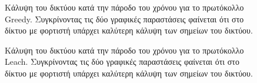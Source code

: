 \begin{figure}[H]
  \centering
  \caption{Κάλυψη του δικτύου κατά την πάροδο του χρόνου για το πρωτόκολλο Greedy. Συγκρίνοντας τις δύο γραφικές παραστάσεις φαίνεται ότι στο δίκτυο με φορτιστή
υπάρχει καλύτερη κάλυψη των σημείων του δικτύου.}
  \label{fig:1exp_3_1}
\end{figure}

\begin{figure}[H]
  \centering
  \caption{Κάλυψη του δικτύου κατά την πάροδο του χρόνου για το πρωτόκολλο Leach. Συγκρίνοντας τις δύο γραφικές παραστάσεις φαίνεται ότι στο δίκτυο με φορτιστή
υπάρχει καλύτερη κάλυψη των σημείων του δικτύου.}
  \label{fig:1exp_3_2}
\end{figure}

